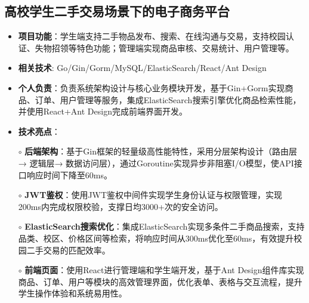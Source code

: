 \subsection{\textbf{高校学生二手交易场景下的电子商务平台} \hspace{2cm}{2024.10 -- 2024.12}}
  \begin{normalsize}
    \begin{itemize}
    \item \textbf{项目功能}：学生端支持二手物品发布、搜索、在线沟通与交易，支持校园认证、失物招领等特色功能；管理端实现商品审核、交易统计、用户管理等。
    \item \textbf{相关技术}: Go/Gin/Gorm/MySQL/ElasticSearch/React/Ant Design
    \item \textbf{个人负责}：负责系统架构设计与核心业务模块开发，基于Gin+Gorm实现商品、订单、用户管理等服务，集成ElasticSearch搜索引擎优化商品检索性能，并使用React+Ant Design完成前端界面开发。
    \item \textbf{技术亮点}：
    \setlength{\itemindent}{1em} %
      \item[$\circ$] \textbf{后端架构}：基于Gin框架的轻量级高性能特性，采用分层架构设计（路由层→ 逻辑层→ 数据访问层），通过Goroutine实现异步非阻塞I/O模型，使API接口响应时间下降至60ms。
        \item[$\circ$] \textbf{JWT鉴权}：使用JWT鉴权中间件实现学生身份认证与权限管理，实现200ms内完成权限校验，支撑日均3000+次的安全访问。
        \item[$\circ$] \textbf{ElasticSearch搜索优化}：集成ElasticSearch实现多条件二手商品搜索，支持品类、校区、价格区间等检索，将响应时间从300ms优化至60ms，有效提升校园二手交易的匹配效率。
        \item[$\circ$] \textbf{前端页面}：使用React进行管理端和学生端开发，基于Ant Design组件库实现商品、订单、用户等模块的高效管理界面，优化表单、表格与交互流程，提升学生操作体验和系统易用性。
    \end{itemize}
  \end{normalsize}